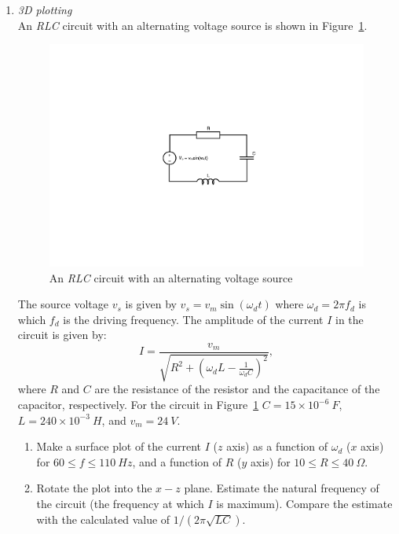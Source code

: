 \begin{enumerate}
\item \textit{3D plotting}\\
An \textit{RLC} circuit with an alternating voltage source is shown in Figure~\ref{fig:RLC-circuit}. 
\begin{figure}[h]
	\myfloatalign
	\includegraphics[width=0.65\linewidth]{Graphics/Additional-Ex/RLC-circuit}
	\caption{An \textit{RLC} circuit with an alternating voltage source}
	\label{fig:RLC-circuit}
\end{figure}
The source voltage $v_s$ is given by $v_s=v_m \sin(\omega_d t)$ where $\omega_d=2\pi f_d$ is which $f_d$ is the driving frequency. The amplitude of the current $I$ in the circuit is given by:
\begin{equation*}
I = \frac{v_m}{\sqrt{R^2 + {\left( \omega_d L - \frac{1}{\omega_d C} \right)}^2}},
\end{equation*}
where $R$ and $C$ are the resistance of the resistor and the capacitance of the capacitor, respectively. For the circuit in Figure~\ref{fig:RLC-circuit} $C=15\times 10^{-6}~F$, $L=240\times 10^{-3}~H$, and $v_m=24~V$.
\begin{enumerate}
\item Make a \threed surface plot of the current $I$ ($z$ axis) as a function of $\omega_d$ ($x$ axis) for $60\leq f \leq 110~Hz$, and a function of $R$ ($y$ axis) for $10\leq R \leq40~\Omega$.
\item Rotate the plot into the $x-z$ plane. Estimate the natural frequency of the circuit (the frequency at which $I$ is maximum). Compare the estimate with the calculated value of $1/(2\pi\sqrt{LC})$.
\end{enumerate}

\newpage

\end{enumerate}
